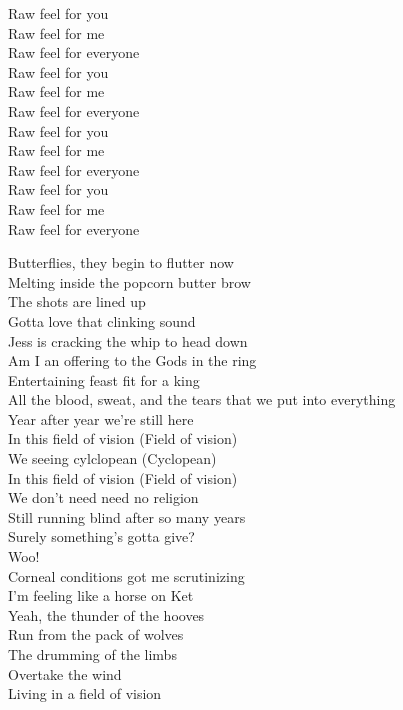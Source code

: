 Raw feel for you \\
Raw feel for me \\
Raw feel for everyone \\
Raw feel for you \\
Raw feel for me \\
Raw feel for everyone \\
Raw feel for you \\
Raw feel for me \\
Raw feel for everyone \\
Raw feel for you \\
Raw feel for me \\
Raw feel for everyone \\



Butterflies, they begin to flutter now \\
Melting inside the popcorn butter brow \\
The shots are lined up \\
Gotta love that clinking sound \\
Jess is cracking the whip to head down \\

Am I an offering to the Gods in the ring \\
Entertaining feast fit for a king \\
All the blood, sweat, and the tears that we put into everything \\
Year after year we're still here \\

In this field of vision (Field of vision) \\
We seeing cylclopean (Cyclopean) \\
In this field of vision (Field of vision) \\
We don't need need no religion \\

Still running blind after so many years \\
Surely something's gotta give? \\
Woo! \\
Corneal conditions got me scrutinizing \\
I'm feeling like a horse on Ket \\
Yeah, the thunder of the hooves \\
Run from the pack of wolves \\
The drumming of the limbs \\
Overtake the wind \\
Living in a field of vision \\

